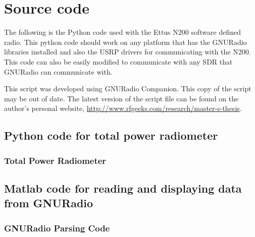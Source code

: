 \appendixtitle
\appendix
\chapter{Source code}

The following is the Python code used with the Ettus N200 software defined radio.  This python code should work on any platform that has the GNURadio libraries installed and also the USRP drivers for communicating with the N200.  This code can also be easily modified to communicate with any SDR that GNURadio can communicate with.  

This script was developed using GNURadio Companion.  This copy of the script may be out of date.  The latest version of the script file can be found on the author's personal website, \url{http://www.rfgeeks.com/research/master-s-thesis}.


\section*{Python code for total power radiometer}

\newcommand{\code}[2]{
  \hrulefill
  \subsection*{#1}
  
  \vspace{2em}
}

\code{Total Power Radiometer}{Code/N200_TPR.py}

\section*{Matlab code for reading and displaying data from GNURadio}

\newcommand{\matlabcode}[2]{
  \hrulefill
  \subsection*{#1}
  
  \vspace{2em}
}

\newpage

\matlabcode{GNURadio Parsing Code}{Code/gnuradio_parse.m}
